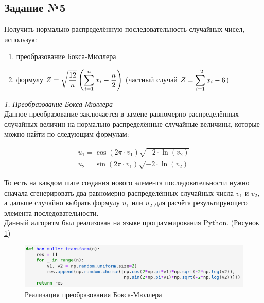 \documentclass[14pt,fleqn]{extarticle}
\begin{document}
	\subsection*{Задание №5}
	Получить нормально распределённую последовательность случайных чисел, используя:
	\begin{enumerate}[topsep=0pt,itemsep=-1ex,partopsep=1ex,parsep=1ex]
		\item преобразование Бокса-Мюллера
		\item формулу $Z = \sqrt{\dfrac{12}{n}}\left(\smashoperator[r]{\sum_{i=1}^{n}} x_i - \dfrac{n}{2}\right)$ (частный случай $Z = \smashoperator[r]{\sum_{i=1}^{12}} x_i - 6$)
	\end{enumerate}

	\vspace{1cm}
	
	\textit{1. Преобразование Бокса-Мюллера}\\

	Данное преобразование заключается в замене равномерно распределённых случайных величин на нормально распределённые случайные величины, которые можно найти по следующим формулам:
	\begin{ceqn}
	\begin{align*}
		u_1 = \cos(2 \pi \cdot v_1) \sqrt{-2 \cdot \ln(v_2)}\\
		u_2 = \sin(2 \pi \cdot v_1) \sqrt{-2 \cdot \ln(v_2)}
	\end{align*}
	\end{ceqn}
	То есть на каждом шаге создания нового элемента последовательности нужно сначала сгенерировать два равномерно распределённых случайных числа $v_1$ и $v_2$, а дальше случайно выбрать формулу $u_1$ или $u_2$ для расчёта результирующего элемента последовательности.\\
	
	\newpage
	Данный алгоритм был реализован на языке программирования Python. (Рисунок \ref{fig:box_muller_transform_code})
	\begin{figure}[h]
		\centering \includegraphics[scale=0.65]{box_muller_transform_code}
		\caption{Реализация преобразования Бокса-Мюллера}
		\label{fig:box_muller_transform_code}
	\end{figure}
	
\end{document}
